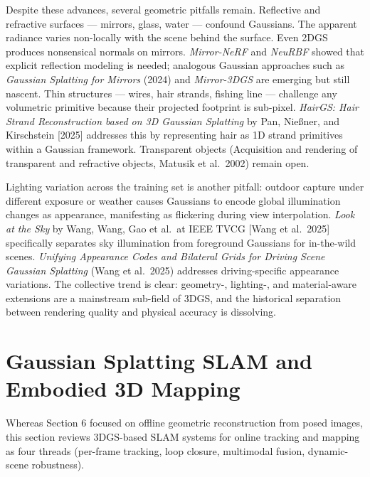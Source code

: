 Despite these advances, several geometric pitfalls remain. Reflective and refractive surfaces --- mirrors, glass, water --- confound Gaussians. The apparent radiance varies non-locally with the scene behind the surface. Even 2DGS produces nonsensical normals on mirrors. \emph{Mirror-NeRF} and \emph{NeuRBF} showed that explicit reflection modeling is needed; analogous Gaussian approaches such as \emph{Gaussian Splatting for Mirrors} (2024) and \emph{Mirror-3DGS} are emerging but still nascent. Thin structures --- wires, hair strands, fishing line --- challenge any volumetric primitive because their projected footprint is sub-pixel. \emph{HairGS: Hair Strand Reconstruction based on 3D Gaussian Splatting} by Pan, Nießner, and Kirschstein {[}2025{]} addresses this by representing hair as 1D strand primitives within a Gaussian framework. Transparent objects (Acquisition and rendering of transparent and refractive objects, Matusik et al.~2002) remain open.

Lighting variation across the training set is another pitfall: outdoor capture under different exposure or weather causes Gaussians to encode global illumination changes as appearance, manifesting as flickering during view interpolation. \emph{Look at the Sky} by Wang, Wang, Gao et al.~at IEEE TVCG {[}Wang et al.~2025{]} specifically separates sky illumination from foreground Gaussians for in-the-wild scenes. \emph{Unifying Appearance Codes and Bilateral Grids for Driving Scene Gaussian Splatting} (Wang et al.~2025) addresses driving-specific appearance variations. The collective trend is clear: geometry-, lighting-, and material-aware extensions are a mainstream sub-field of 3DGS, and the historical separation between rendering quality and physical accuracy is dissolving.

\section{Gaussian Splatting SLAM and Embodied 3D Mapping}\label{gaussian-splatting-slam-and-embodied-3d-mapping}

Whereas Section 6 focused on offline geometric reconstruction from posed images, this section reviews 3DGS-based SLAM systems for online tracking and mapping as four threads (per-frame tracking, loop closure, multimodal fusion, dynamic-scene robustness).

